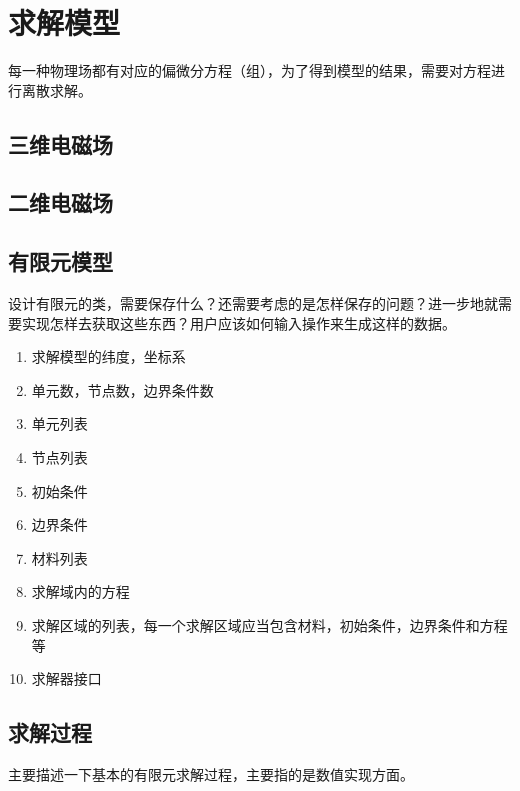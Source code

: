 \chapter{求解模型}
每一种物理场都有对应的偏微分方程（组），为了得到模型的结果，需要对方程进行离散求解。
\section{三维电磁场}
               
\section{二维电磁场}

\section{有限元模型}
设计有限元的类，需要保存什么？还需要考虑的是怎样保存的问题？进一步地就需要实现怎样去获取这些东西？用户应该如何输入操作来生成这样的数据。
\begin{enumerate}
	\item 求解模型的纬度，坐标系
	\item 单元数，节点数，边界条件数
	\item 单元列表
	\item 节点列表
	\item 初始条件
	\item 边界条件
	\item 材料列表
	\item 求解域内的方程
	\item 求解区域的列表，每一个求解区域应当包含材料，初始条件，边界条件和方程等
	\item 求解器接口
\end{enumerate}
\section{求解过程}
主要描述一下基本的有限元求解过程，主要指的是数值实现方面。